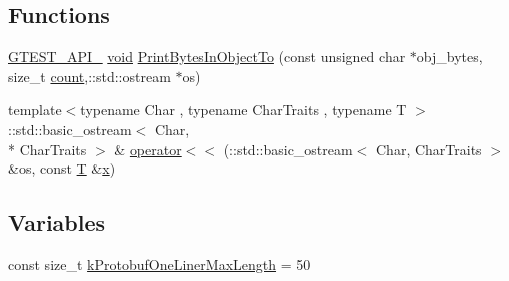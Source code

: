 \subsection*{Functions}
\begin{DoxyCompactItemize}
\item 
\hyperlink{ts__gtest_8h_aa73be6f0ba4a7456180a94904ce17790}{G\-T\-E\-S\-T\-\_\-\-A\-P\-I\-\_\-} \hyperlink{legacy_8hpp_a8bb47f092d473522721002c86c13b94e}{void} \hyperlink{namespacetesting_1_1internal2_a04a384ee5de3a9f4f00a6052ea79b495}{Print\-Bytes\-In\-Object\-To} (const unsigned char $\ast$obj\-\_\-bytes, size\-\_\-t \hyperlink{tracking_8hpp_a88d78b1935cd8bdee70a44eaaf326b1e}{count},\-::std\-::ostream $\ast$os)
\item 
{\footnotesize template$<$typename Char , typename Char\-Traits , typename T $>$ }\\\-::std\-::basic\-\_\-ostream$<$ Char, \\*
Char\-Traits $>$ \& \hyperlink{namespacetesting_1_1internal2_a07dbe129beb8952074f04b599dfce39b}{operator$<$$<$} (\-::std\-::basic\-\_\-ostream$<$ Char, Char\-Traits $>$ \&os, const \hyperlink{calib3d_8hpp_a3efb9551a871ddd0463079a808916717}{T} \&\hyperlink{highgui__c_8h_a6150e0515f7202e2fb518f7206ed97dc}{x})
\end{DoxyCompactItemize}
\subsection*{Variables}
\begin{DoxyCompactItemize}
\item 
const size\-\_\-t \hyperlink{namespacetesting_1_1internal2_a140c8efd51e63a3def98445bff107518}{k\-Protobuf\-One\-Liner\-Max\-Length} = 50
\end{DoxyCompactItemize}


